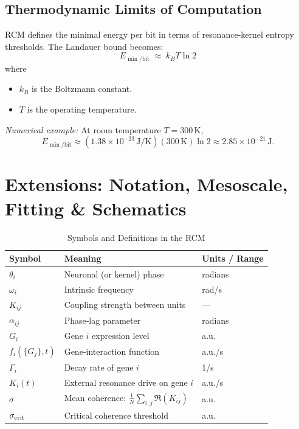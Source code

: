 \subsection{Thermodynamic Limits of Computation}

RCM defines the minimal energy per bit in terms of resonance‐kernel entropy thresholds.  The Landauer bound becomes:
\begin{equation}
  E_{\min/\text{bit}}
  \;\approx\; k_{B} T \ln 2
  \label{eq:Emin}
\end{equation}
where
\begin{itemize}
  \item $k_{B}$ is the Boltzmann constant.
  \item $T$ is the operating temperature.
\end{itemize}
\emph{Numerical example:} At room temperature $T=300\,$K,
\[
  E_{\min/\text{bit}} \approx (1.38\times10^{-23}\,\mathrm{J/K})(300\,\mathrm{K})\ln2
  \approx 2.85\times10^{-21}\,\mathrm{J}.
\]

\section{Extensions: Notation, Mesoscale, Fitting \& Schematics}

\begin{table}[ht]
  \centering
  \caption{Symbols and Definitions in the RCM}
  \label{tab:notation}
  \begin{tabular}{@{}lll@{}}
    \toprule
    Symbol & Meaning                                        & Units / Range \\
    \midrule
    $\theta_i$        & Neuronal (or kernel) phase                     & radians       \\
    $\omega_i$        & Intrinsic frequency                             & rad/s         \\
    $K_{ij}$          & Coupling strength between units                 & —             \\
    $\alpha_{ij}$     & Phase‐lag parameter                             & radians       \\
    $G_i$             & Gene $i$ expression level                       & a.u.          \\
    $f_i(\{G_j\},t)$  & Gene‐interaction function                       & a.u./s        \\
    $\Gamma_i$        & Decay rate of gene $i$                          & 1/s           \\
    $K_i(t)$          & External resonance drive on gene $i$            & a.u./s        \\
    $\sigma$          & Mean coherence: $\frac1N\sum_{i,j}\Re(K_{ij})$  & a.u.          \\
    $\sigma_{\rm crit}$ & Critical coherence threshold                  & a.u.          \\
    \bottomrule
  \end{tabular}
\end{table}

